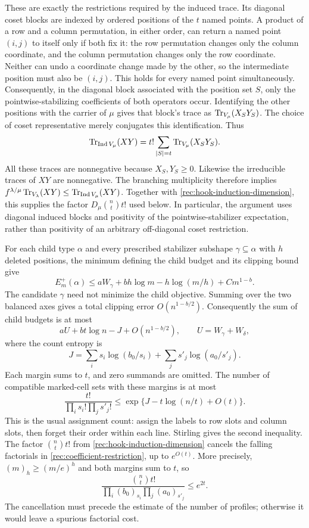 These are exactly the restrictions required by the induced trace.
Its diagonal coset blocks are indexed by ordered positions of the
$t$ named points.  A product of a row and a column permutation, in
either order, can return a named point $(i,j)$ to itself only if both
fix it: the row permutation changes only the column coordinate, and
the column permutation changes only the row coordinate.  Neither can
undo a coordinate change made by the other, so the intermediate
position must also be $(i,j)$.  This
holds for every named point simultaneously.  Consequently, in the
diagonal block associated with the position set $S$, only the
pointwise-stabilizing coefficients of both operators occur.
Identifying the other positions with the carrier of $\mu$ gives
that block's trace as $\operatorname{Tr}_{V_\mu}(X_SY_S)$.  The choice of coset
representative merely conjugates this identification.  Thus
\begin{equation}\label{rec:induced-diagonal-trace}
 \operatorname{Tr}_{\operatorname{Ind}V_\mu}(XY)
   =t!\sum_{|S|=t}\operatorname{Tr}_{V_\mu}(X_SY_S).
\end{equation}
All these traces are nonnegative because $X_S,Y_S\ge0$.
Likewise the irreducible traces of $XY$ are nonnegative.  The
branching multiplicity therefore implies
$f^{\lambda/\mu}\operatorname{Tr}_{V_\lambda}(XY)
\le\operatorname{Tr}_{\operatorname{Ind}V_\mu}(XY)$.
Together with \eqref{rec:hook-induction-dimension}, this supplies
the factor $D_\mu\binom nt t!$ used below.  In particular, the
argument uses diagonal induced blocks and positivity of the
pointwise-stabilizer expectation, rather than positivity of an
arbitrary off-diagonal coset restriction.

For each child type $\alpha$ and every prescribed stabilizer
subshape $\gamma\subseteq\alpha$ with $h$ deleted positions, the
minimum defining the child budget and its clipping bound give
\[
 E_m^+(\alpha)\le aW_\gamma+bh\log m-h\log(m/h)+Cm^{1-b}.
\]
The candidate $\gamma$ need not minimize the child objective.
Summing over the two balanced axes gives a total clipping error
$O(n^{1-b/2})$. Consequently the sum of child budgets is at most
\begin{equation}\label{rec:hook-local-budget}
 aU+bt\log n-J+O(n^{1-b/2}),
 \qquad U=W_\gamma+W_\delta,
\end{equation}
where the count entropy is
\[
 J=\sum_i s_i\log(b_0/s_i)+\sum_j s'_j\log(a_0/s'_j).
\]
Each margin sums to $t$, and zero summands are omitted.  The number of compatible marked-cell sets with these
margins is at most
\begin{equation}\label{rec:hook-margin-count}
 \frac{t!}{\prod_i s_i!\prod_j s'_j!}
 \le\exp\{J-t\log(n/t)+O(t)\}.
\end{equation}
This is the usual assignment count: assign the labels to row slots
and column slots, then forget their order within each line.  Stirling
gives the second inequality.  The factor $\binom nt t!$ from
\eqref{rec:hook-induction-dimension} cancels the falling factorials
in \eqref{rec:coefficient-restriction}, up to $e^{O(t)}$.
More precisely, $(m)_h\ge(m/e)^h$ and both margins sum to $t$, so
\[
 \frac{\binom nt t!}
 {\prod_i(b_0)_{s_i}\prod_j(a_0)_{s'_j}}
 \le e^{2t}.
\]
The cancellation must precede the estimate of the number of profiles;
otherwise it would leave a spurious factorial cost.

